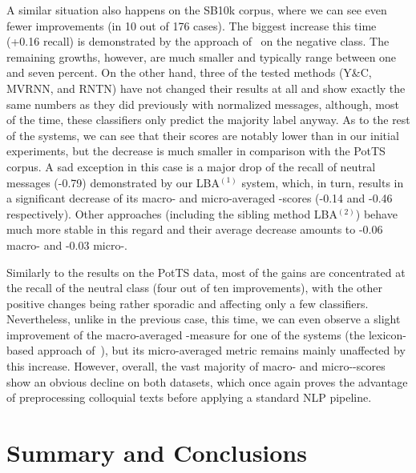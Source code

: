 A similar situation also happens on the SB10k corpus, where we can see
even fewer improvements (in 10 out of 176 cases).  The biggest
increase this time (+0.16 recall) is demonstrated by the approach
of~\citet{Baziotis:17} on the negative class.  The remaining growths,
however, are much smaller and typically range between one and seven
percent.  On the other hand, three of the tested methods (Y\&C, MVRNN,
and RNTN) have not changed their results at all and show exactly the
same numbers as they did previously with normalized messages,
although, most of the time, these classifiers only predict the
majority label anyway.  As to the rest of the systems, we can see that
their scores are notably lower than in our initial experiments, but
the decrease is much smaller in comparison with the PotTS corpus.  A
sad exception in this case is a major drop of the recall of neutral
messages (-0.79) demonstrated by our LBA$^{(1)}$ system, which, in
turn, results in a significant decrease of its macro- and
micro-averaged \F{}-scores (-0.14 and -0.46 respectively).  Other
approaches (including the sibling method LBA$^{(2)}$) behave much more
stable in this regard and their average decrease amounts to -0.06
macro- and -0.03 micro-\F{}.

Similarly to the results on the PotTS data, most of the gains are
concentrated at the recall of the neutral class (four out of ten
improvements), with the other positive changes being rather sporadic
and affecting only a few classifiers.  Nevertheless, unlike in the
previous case, this time, we can even observe a slight improvement of
the macro-averaged \F-measure for one of the systems (the
lexicon-based approach of~\citeauthor{Jurek:15}), but its
micro-averaged metric remains mainly unaffected by this increase.
However, overall, the vast majority of macro- and micro-\F-scores show
an obvious decline on both datasets, which once again proves the
advantage of preprocessing colloquial texts before applying a standard
NLP pipeline.


\section{Summary and Conclusions}\label{slsa:subsec:conclusions}

